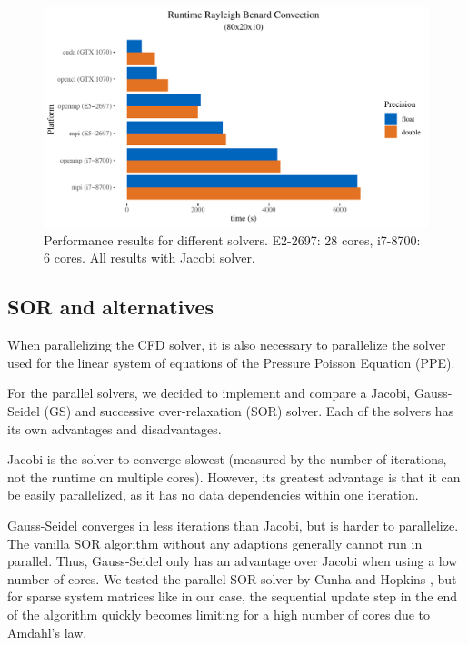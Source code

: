 \documentclass{article}%
\begin{document}
\begin{figure}[htb]
\centering
\includegraphics[width=1\linewidth]{../tests/graphs/runtime_rayleigh_benard_convection_8-2-1_platforms.pdf}
\caption{Performance results for different solvers. E2-2697: 28 cores, i7-8700: 6 cores. All results with Jacobi solver.}
\label{fig:platforms}
\end{figure}

\subsection{SOR and alternatives}
When parallelizing the CFD solver, it is also necessary to parallelize the solver used for the linear system of equations of the Pressure Poisson Equation (PPE).

For the parallel solvers, we decided to implement and compare a Jacobi, Gauss-Seidel (GS) and successive over-relaxation (SOR) solver. Each of the solvers has its own advantages and disadvantages.

Jacobi is the solver to converge slowest (measured by the number of iterations, not the runtime on multiple cores). However, its greatest advantage is that it can be easily parallelized, as it has no data dependencies within one iteration.

Gauss-Seidel converges in less iterations than Jacobi, but is harder to parallelize. The vanilla SOR algorithm without any adaptions generally cannot run in parallel. Thus, Gauss-Seidel only has an advantage over Jacobi when using a low number of cores. We tested the parallel SOR solver by Cunha and Hopkins \cite{parallel-sor}, but for sparse system matrices like in our case, the sequential update step in the end of the algorithm quickly becomes limiting for a high number of cores due to Amdahl’s law.
\end{document}
